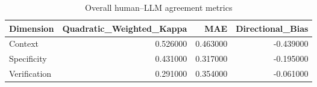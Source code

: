 \begin{table}
\caption{Overall human--LLM agreement metrics}
\label{tab:rq1-overall-agreement}
\begin{tabular}{lrrr}
\toprule
Dimension & Quadratic\_Weighted\_Kappa & MAE & Directional\_Bias \\
\midrule
Context & 0.526000 & 0.463000 & -0.439000 \\
Specificity & 0.431000 & 0.317000 & -0.195000 \\
Verification & 0.291000 & 0.354000 & -0.061000 \\
\bottomrule
\end{tabular}
\end{table}
